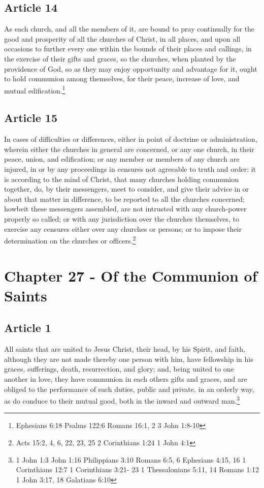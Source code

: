 \documentclass[12pt,letterpaper]{book}
\begin{document}
\section{Article 14}

As each church, and all the members of it, are bound to pray continually for the good and prosperity of all the churches of Christ, in all places, and upon all occasions to further every one within the bounds of their places and callings, in the exercise of their gifts and graces, so the churches, when planted by the providence of God, so as they may enjoy opportunity and advantage for it, ought to hold communion among themselves, for their peace, increase of love, and mutual edification.\footnote{Ephesians 6:18 Psalms 122:6 Romans 16:1, 2 3 John 1:8-10}

\section{Article 15}

In cases of difficulties or differences, either in point of doctrine or administration, wherein either the churches in general are concerned, or any one church, in their peace, union, and edification; or any member or members of any church are injured, in or by any proceedings in censures not agreeable to truth and order: it is according to the mind of Christ, that many churches holding communion together, do, by their messengers, meet to consider, and give their advice in or about that matter in difference, to be reported to all the churches concerned; howbeit these messengers assembled, are not intrusted with any church-power properly so called; or with any jurisdiction over the churches themselves, to exercise any censures either over any churches or persons; or to impose their determination on the churches or officers.\footnote{Acts 15:2, 4, 6, 22, 23, 25 2 Corinthians 1:24 1 John 4:1}

\chapter{Chapter 27 - Of the Communion of Saints}
\section{Article 1}

All saints that are united to Jesus Christ, their head, by his Spirit, and faith, although they are not made thereby one person with him, have fellowship in his graces, sufferings, death, resurrection, and glory; and, being united to one another in love, they have communion in each others gifts and graces, and are obliged to the performance of such duties, public and private, in an orderly way, as do conduce to their mutual good, both in the inward and outward man.\footnote{1 John 1:3 John 1:16 Philippians 3:10 Romans 6:5, 6 Ephesians 4:15, 16 1 Corinthians 12:7 1 Corinthians 3:21- 23 1 Thessalonians 5:11, 14 Romans 1:12 1 John 3:17, 18 Galatians 6:10}
\end{document}
